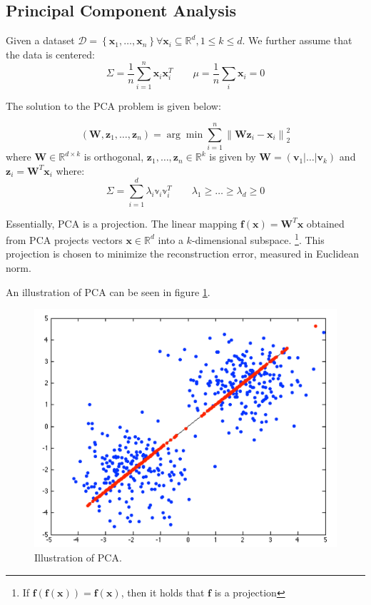 \documentclass[a4paper,10pt,twoside]{article}
\newcommand\norm[1]{\left\lVert#1\right\rVert}
\begin{document}
\subsection{Principal Component Analysis}

Given a dataset $\mathcal{D}=\left\{\mathbf{x}_1,\ldots, \mathbf{x}_n\right\}\forall\mathbf{x}_i\subseteq\mathbb{R}^{d}, 1\leq k\leq d$. We further assume that the data is centered:
\begin{equation*}
    \Sigma = \frac{1}{n}\sum_{i=1}^{n}\mathbf{x}_i\mathbf{x}_i^T \qquad \mu = \frac{1}{n}\sum_{i}\mathbf{x}_i=0
\end{equation*}

The solution to the PCA problem is given below:

\begin{equation*}
    (\mathbf{W}, \mathbf{z}_1, \ldots, \mathbf{z}_n)=\arg\min\sum_{i=1}^{n}\norm{\mathbf{W}\mathbf{z}_i-\mathbf{x}_i}^2_2
\end{equation*}
where $\mathbf{W}\in\mathbb{R}^{d\times k}$ is orthogonal, $\mathbf{z}_1, \ldots, \mathbf{z}_n\in\mathbb{R}^k$ is given by $\mathbf{W}=(\mathbf{v}_1|\ldots|\mathbf{v}_k)$ and $\mathbf{z}_i=\mathbf{W}^T\mathbf{x}_i$ where:
\begin{equation*}
    \Sigma = \sum_{i=1}^{d}\lambda_i\mathbb{v}_i\mathbb{v}_i^T \qquad \lambda_1\geq \ldots\geq \lambda_d\geq 0
\end{equation*}

Essentially, PCA is a projection. The linear mapping $\mathbf{f}(\mathbf{x})=\mathbf{W}^T\mathbf{x}$ obtained from PCA projects vectors $\mathbf{x}\in\mathbb{R}^d$ into a $k$-dimensional subspace. \footnote{If $\mathbf{f}(\mathbf{f}(\mathbf{x}))=\mathbf{f}(\mathbf{x})$, then it holds that $\mathbf{f}$ is a projection}. This projection is chosen to minimize the reconstruction error, measured in Euclidean norm.

An illustration of PCA can be seen in figure \ref{pca_illustration}.

\begin{figure}
    \centering
    \includegraphics[width=.5\textwidth]{figures/pca-illustration.png}
    \caption{Illustration of PCA.}
    \label{pca_illustration}
\end{figure}
\end{document}

